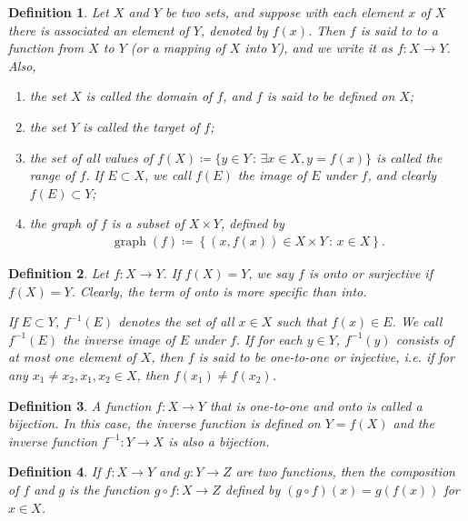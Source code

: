 \documentclass[10pt]{book}
\newtheorem{definition}{Definition}[chapter]
\theoremstyle{definition}
\numberwithin{equation}{chapter}
\begin{document}
\begin{definition}
Let $X$ and $Y$ be two sets, and suppose with each element $x$ of $X$ there is associated an element of $Y$, denoted by $f(x)$. Then $f$ is said to to a function from $X$ to $Y$ (or a mapping of $X$ into $Y$), and we write it as $f: X \to Y$. Also,
\begin{enumerate}[label=(\alph*)]
    \item the set $X$ is called the domain of $f$, and $f$ is said to be defined on $X$;
    
    \item the set $Y$ is called the target of $f$;
    
    \item the set of all values of $f(X) \coloneqq \{y \in Y \,:\, \exists x \in X, y = f(x)\}$ is called the range of $f$. If $E \subset X$, we call $f(E)$ the image of $E$ under $f$, and clearly $f(E) \subset Y$;
    
    \item the graph of $f$ is a subset of $X \times Y$, defined by
    \begin{align*}
        \operatorname{graph}(f) \coloneqq \left\{(x,f(x)) \in X \times Y \,:\, x \in X \right\}.
    \end{align*}
\end{enumerate}
\end{definition}

\medskip

\begin{definition}
Let $f: X \to Y$. If $f(X) = Y$, we say $f$ is onto or surjective if $f(X) = Y$. Clearly, the term of onto is more specific than into.

If $E \subset Y$, $f^{-1}(E)$ denotes the set of all $x \in X$ such that $f(x) \in E$. We call $f^{-1}(E)$ the inverse image of $E$ under $f$. If for each $y \in Y$, $f^{-1}(y)$ consists of at most one element of $X$, then $f$ is said to be one-to-one or injective, i.e. if for any $x_1 \neq x_2, x_1, x_2 \in X$, then $f(x_1) \neq f(x_2)$.
\end{definition}

\medskip

\begin{definition}
A function $f:X \to Y$ that is one-to-one and onto is called a bijection. In this case, the inverse function is defined on $Y = f(X)$ and the inverse function $f^{-1}: Y \to X$ is also a bijection.
\end{definition}

\begin{definition}
If $f: X \to Y$ and $g: Y \to Z$ are two functions, then the composition of $f$ and $g$ is the function $g \circ f: X \to Z$ defined by $(g \circ f)(x) = g(f(x))$ for $x \in X$.
\end{definition}
\end{document}
